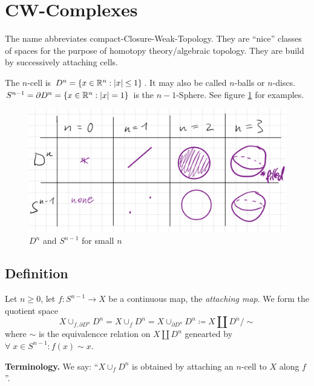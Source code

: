 \documentclass{TemplateLecture}
\begin{document}
\section{CW-Complexes}

The name abbreviates compact-Closure-Weak-Topology. They are \enquote{nice} classes of spaces for the purpose of homotopy theory/algebraic topology. They are build by successively attaching cells.

The \(n\)-cell is \(D^n = \{x \in \mathbb{R}^n: \lvert x\rvert \leq 1\}\). It may also be called \(n\)-balls or \(n\)-discs.
\(S^{n-1} = \partial D^n = \{x\in \mathbb{R}^n : \lvert x\rvert = 1\}\) is the \(n-1\)-Sphere.
See figure \ref{fig:exDn} for examples.

\begin{figure}
    \centering
    \includegraphics[width=0.8\linewidth]{pic/exDn.png}
    \caption{\(D^n\) and \(S^{n-1}\) for small \(n\)}
    \label{fig:exDn}
\end{figure}


\subsection{Definition}

\begin{construction}
    Let \(n \geq 0\), let \(f\colon S^{n-1} \to X\) be a continuous map, the \emph{attaching map}. We form the quotient space
    \[X \cup_{f, \partial D^n} D^n = X \cup_f D^n = X \cup_{\partial D^n} D^n \coloneq X \amalg D^n/\sim\]
    where \(\sim\) is the equivalencce relation on \(X\amalg D^n\) genearted by \(\forall \; x \in S^{n-1}: f(x) \sim x\).
\end{construction}

\textbf{Terminology.} We say: \enquote{\(X\cup_f D^n\) is obtained by attaching an \(n\)-cell to \(X\) along \(f\)}.
\end{document}
